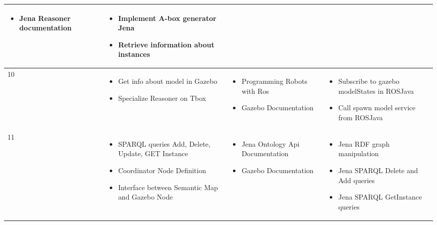 \begin{center}
\begin{tabular}{ | l | p{4cm} | p{4cm} | p{5cm} |}
\begin{itemize}
     \item Jena Reasoner documentation     
     \end{itemize}
      & \begin{itemize}
     \item Implement A-box generator Jena
     \item Retrieve information about instances     
    \end{itemize}  \\
    \hline
    10 & \begin{itemize}
     \item Get info about model in Gazebo 
     \item Specialize Reasoner on Tbox
     \end{itemize} 
     & \begin{itemize}
     \item Programming Robots with Ros \cite{bib9}      
     \item Gazebo Documentation \cite{bib10}    
     \end{itemize}
      & \begin{itemize}
     \item Subscribe to gazebo modelStates in ROSJava
     \item Call spawn model service from ROSJava
    \end{itemize}  \\
    \hline
    11 & \begin{itemize}
     \item SPARQL queries Add, Delete, Update, GET Instance
     \item Coordinator Node Definition
     \item Interface between Semantic Map and Gazebo Node
     \end{itemize} 
     & \begin{itemize}
     \item Jena Ontology Api Documentation \cite{bib13}      
     \item Gazebo Documentation \cite{bib10}    
     \end{itemize}
      & \begin{itemize}
     \item Jena RDF graph manipulation 
     \item Jena SPARQL Delete and Add queries 
     \item Jena SPARQL GetInstance queries 
    \end{itemize}  \\
    \hline
    
    \end{tabular}
\end{center}

